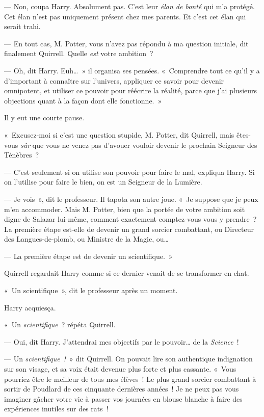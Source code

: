 --- Non, coupa Harry.
Absolument pas.
C'est leur \emph{élan de bonté} qui m'a protégé.
Cet élan n'est pas uniquement présent chez mes parents.
Et c'est cet élan qui serait trahi.

--- En tout cas, M. Potter, vous n'avez pas répondu à ma question initiale, dit finalement Quirrell.
Quelle \emph{est} votre ambition~?

--- Oh, dit Harry.
Euh…~» il organisa ses pensées.
«~Comprendre tout ce qu'il y a d'important à connaître sur l'univers, appliquer ce savoir pour devenir omnipotent, et utiliser ce pouvoir pour réécrire la réalité, parce que j'ai plusieurs objections quant à la façon dont elle fonctionne.~»

Il y eut une courte pause.

«~Excusez-moi si c'est une question stupide, M. Potter, dit Quirrell, mais êtes-vous \emph{sûr} que vous ne venez pas d'avouer vouloir devenir le prochain Seigneur des Ténèbres~?

--- C'est seulement si on utilise son pouvoir pour faire le mal, expliqua Harry.
Si on l'utilise pour faire le bien, on est un Seigneur de la Lumière.

--- Je vois~», dit le professeur.
Il tapota son autre joue.
«~Je suppose que je peux m'en accommoder.
Mais M. Potter, bien que la portée de votre ambition soit digne de Salazar lui-même, comment exactement comptez-vous vous y prendre~?
La première étape est-elle de devenir un grand sorcier combattant, ou Directeur des Langues-de-plomb, ou Ministre de la Magie, ou…

--- La première étape est de devenir un scientifique.~»

Quirrell regardait Harry comme si ce dernier venait de se transformer en chat.

«~Un scientifique~», dit le professeur après un moment.

Harry acquiesça.

«~Un \emph{scientifique}~? répéta Quirrell.

--- Oui, dit Harry.
J'attendrai mes objectifs par le pouvoir… de la \emph{Science}~!

--- Un \emph{scientifique~!}~» dit Quirrell.
On pouvait lire son authentique indignation sur son visage, et sa voix était devenue plus forte et plus cassante.
«~Vous pourriez être le meilleur de tous mes élèves~!
Le plus grand sorcier combattant à sortir de Poudlard de ces cinquante dernières années~!
Je ne peux pas vous imaginer gâcher votre vie à passer vos journées en blouse blanche à faire des expériences inutiles sur des rats~!


